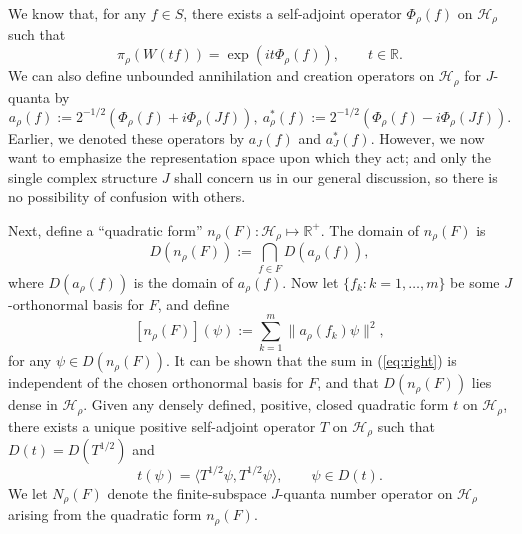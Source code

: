 \documentclass[12pt]{article}
\theoremstyle{remark}
\theoremstyle{definition}
\newcommand{\norm}[1]{\| #1\|}
\newcommand{\hil}[1]{\mathcal{#1}}
\begin{document}
We know 
that, for any $f\in S$, there exists a
self-adjoint operator $\Phi_{\rho}(f)$ on
$\hil{H}_{\rho}$ such that
\begin{equation} \pi _{\rho} (W(tf))=\exp \left( it\Phi_{\rho}(f)
  \right) , \qquad t\in \mathbb{R}. \end{equation}  
We can also define unbounded annihilation and creation operators on 
$\hil{H}_{\rho}$ for $J$-quanta by
\begin{equation} a_{\rho}(f) := 2^{-1/2}(\Phi_{\rho}(f)+i\Phi
  _{\rho}(Jf)) ,\ 
a^{*}_{\rho}(f):=2^{-1/2}(\Phi_{\rho}(f)-i\Phi_{\rho}(Jf)) .
\end{equation}
Earlier, we denoted these operators by $a_{J}(f)$ and $a^{*}_{J}(f)$.  However, we now 
want to emphasize the representation space upon which they act; and only the single complex structure $J$ 
shall concern us in our general discussion, so there is no possibility of confusion with others. 

Next, define a ``quadratic form'' $n_{\rho}(F):\hil{H}_{\rho}\mapsto\mathbb{R}^{+}$. 
 The domain of $n_{\rho}(F)$
is \begin{equation} D(n_{\rho}(F)):=\bigcap _{f\in F} D(a_{\rho}(f))
  ,\end{equation} where $D(a_{\rho}(f))$ is the domain of $a_{\rho
  }(f)$.  Now let $\{ f_{k}:k=1,\ldots,m \}$ be some $J$-orthonormal basis 
  for $F$, and define
\begin{equation} \label{eq:right} [n_{\rho}(F)](\psi ):=\sum _{k=1}^{m}\norm{ a_{\rho
      }(f_{k})\psi }^{2} ,\end{equation} 
for any $\psi \in D(n_{\rho}(F))$.  It can be shown that the sum in (\ref{eq:right}) 
is independent of the chosen orthonormal basis for $F$, and 
that $D(n_{\rho}(F))$ lies dense in $\hil{H}_{\rho}$.   
Given any densely defined, positive, 
closed quadratic form $t$ on $\hil{H}_{\rho}$, there exists a unique 
positive self-adjoint operator $T$ on $\hil{H}_{\rho}$
such that $D(t)=D(T^{1/2})$ and \begin{equation} 
t(\psi )=\langle T^{1/2}\psi ,T^{1/2}\psi
\rangle , \qquad \psi \in D(t).\end{equation}
We let $N_{\rho}(F)$ denote the finite-subspace $J$-quanta number operator 
on $\hil{H}_{\rho}$ arising from the quadratic 
form $n_{\rho}(F)$.  
\end{document}
